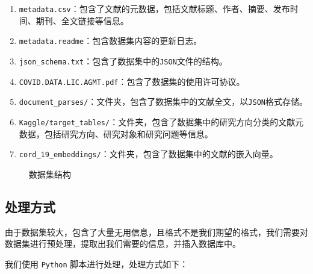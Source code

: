 \documentclass[UTF8,openany]{ctexbook}
\begin{document}
\begin{enumerate}
    \item \texttt{metadata.csv}：包含了文献的元数据，包括文献标题、作者、摘要、发布时间、期刊、全文链接等信息。
    \item \texttt{metadata.readme}：包含数据集内容的更新日志。
    \item \texttt{json\_schema.txt}：包含了数据集中的\texttt{JSON}文件的结构。
    \item \texttt{COVID.DATA.LIC.AGMT.pdf}：包含了数据集的使用许可协议。
    \item \texttt{document\_parses/}：文件夹，包含了数据集中的文献全文，以\texttt{JSON}格式存储。
    \item \texttt{Kaggle/target\_tables/}：文件夹，包含了数据集中的研究方向分类的文献元数据，包括研究方向、研究对象和研究问题等信息。
    \item \texttt{cord\_19\_embeddings/}：文件夹，包含了数据集中的文献的嵌入向量。

\end{enumerate}
\begin{figure}[H]
    \caption{数据集结构}
    \label{fig:dataset}
\end{figure}




\subsection{处理方式}

\label{sec:dataProcessing}

由于数据集较大，包含了大量无用信息，且格式不是我们期望的格式，我们需要对数据集进行预处理，提取出我们需要的信息，并插入数据库中。

我们使用 \texttt{Python} 脚本进行处理，处理方式如下：
\end{document}
